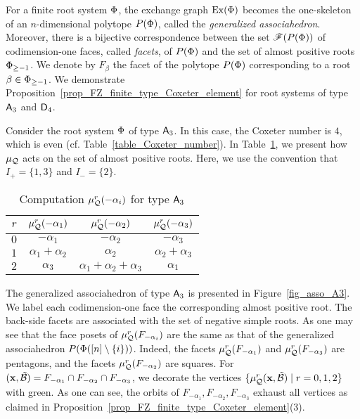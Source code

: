 For a finite root system $\Phi$, the exchange graph $\operatorname{Ex}(\Phi)$ becomes the one-skeleton of an $n$-dimensional polytope $P(\Phi)$, called the \emph{generalized associahedron}.  
Moreover, there is a bijective correspondence between the set $\mathscr{F}(P(\Phi))$ of codimension-one faces, called \emph{facets}, of $P(\Phi)$ and the set of almost positive roots $\Phi_{\ge -1}$. 
We denote by $F_{\beta}$ the facet of the polytope $P(\Phi)$ corresponding to a root $\beta \in \Phi_{\ge -1}$. 
We demonstrate Proposition~\ref{prop_FZ_finite_type_Coxeter_element} for root systems of type $\mathsf{A}_3$ and $\mathsf{D}_4$. 
\begin{example}
	Consider the root system $\Phi$ of type $\mathsf{A}_3$. In this case, the
	Coxeter number is $4$, which is even (cf.
	Table~\ref{table_Coxeter_number}). In Table~\ref{table_A3_tau_action}, we
	present how $\mu_{\mathcal{Q}}$ acts on the set of almost positive roots. Here, we use the convention that
	$I_+ = \{1,3\}$ and $I_- = \{2\}$.
	\begin{table}[b]
		\begin{tabular}{c|ccc}
			\toprule
			$r$ & $\mu_{\mathcal{Q}}^r({-\alpha_1})$ 
			& $ \mu_{\mathcal{Q}}^r({-\alpha_2})$ 
			& $ \mu_{\mathcal{Q}}^r({-\alpha_3})$\\ 
			\midrule
			$0$ & ${-\alpha_1}$ & ${-\alpha_2}$ & ${-\alpha_3}$ \\
			$1$ & ${\alpha_1 + \alpha_2}$ & ${\alpha_2}$ &${\alpha_2 + \alpha_3}$ \\
			$2$ & ${\alpha_3}$ & ${\alpha_1 + \alpha_2 + \alpha_3}$ & ${\alpha_1}$\\
			\bottomrule
		\end{tabular}
		\caption{Computation $\mu_{\mathcal{Q}}^r({-\alpha_i})$ for type $\mathsf{A}_3$}\label{table_A3_tau_action}
	\end{table}
	The generalized associahedron of type $\mathsf{A}_3$ is presented in
	Figure~\ref{fig_asso_A3}. We label each codimension-one face the corresponding almost
	positive root. The back-side facets are associated with the set of
	negative simple roots. As one may see that the face posets of $\mu_{\mathcal{Q}}^r(F_{-\alpha_i})$ 
	are the same as that of the
	generalized associahedron $P(\Phi ([n]\setminus \{i\}))$. Indeed, the facets
	$\mu_{\mathcal{Q}}^r(F_{-\alpha_1})$ and
	$\mu_{\mathcal{Q}}^r(F_{-\alpha_3})$ are pentagons, and the facets 
	$\mu_{\mathcal{Q}}^r(F_{-\alpha_2})$ are squares.
For $(\mathbf{x}, \mathcal{\tilde{B}}) = F_{-\alpha_1} \cap F_{-\alpha_2} \cap F_{-\alpha_3}$, 
we decorate the vertices $\{ \mu_{\mathcal{Q}}^r(\mathbf{x},\mathcal{\tilde{B}}) \mid r = 0,1,2 \}$ with green. As one can see, the orbits of $F_{-\alpha_1}, F_{-\alpha_2}, F_{-\alpha_3}$ exhaust all vertices as claimed in Proposition~\ref{prop_FZ_finite_type_Coxeter_element}(3). 
\end{example}

